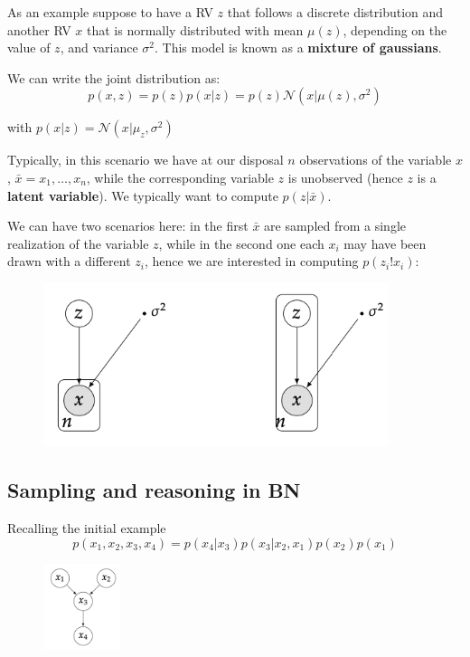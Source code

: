 \begin{exampleblock}
    As an example suppose to have a RV $z$ that follows a discrete distribution and another RV $x$ that is normally distributed with mean $\mu(z)$, depending on the value of $z$, and variance $\sigma^2$. This model is known as a \textbf{mixture of gaussians}.
    
    We can write the joint distribution as:
    \[
        p(x,z) = p(z)p(x|z) = p(z)\mathcal{N}(x|\mu(z), \sigma^2)
    \]

    with $p(x|z) = \mathcal{N}(x|\mu_z, \sigma^2)$

    Typically, in this scenario we have at our disposal $n$ observations of the variable $x$, $\bar{x} = x_1,\dots, x_n$, while the corresponding variable $z$ is unobserved (hence $z$ is a \textbf{latent variable}). We typically want to compute $p(z|\bar{x})$.

    We can have two scenarios here: in the first $\bar{x}$ are sampled from a single realization of the variable $z$, while in the second one each $x_i$ may have been drawn with a different $z_i$, hence we are interested in computing $p(z_i!x_i)$:

    \begin{figure}[H]
        \centering
        \includegraphics[width=0.9\textwidth]{assets/fig3.png}
    \end{figure}
    
\end{exampleblock}

\subsection{Sampling and reasoning in BN}

Recalling the initial example 
\[
    p(x_1,x_2,x_3,x_4) = p(x_4|x_3)p(x_3|x_2,x_1)p(x_2)p(x_1)
\]

\begin{figure}[H]
    \centering
    \includegraphics[width=0.2\textwidth]{assets/fig1.png}
\end{figure}

